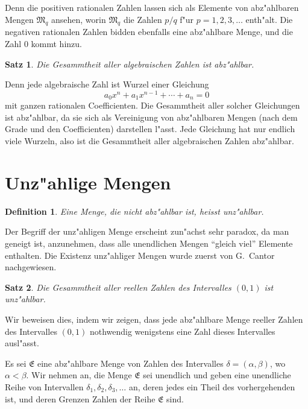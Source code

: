 \documentclass[10pt,a4paper]{article}
\theoremstyle{weberstyle}
\newtheorem{satz}{Satz}[section]
\newtheorem{definition}{Definition}[section]
\begin{document}
Denn die positiven rationalen Zahlen lassen sich als Elemente von
abz"ahlbaren Mengen $\mathfrak{M}_q$ ansehen, worin $\mathfrak{M}_q$ die Zahlen
$p/q$ f"ur $p=1,2,3,\dots$ enth"alt. Die negativen rationalen Zahlen
bidden ebenfalls eine abz"ahlbare Menge, und die Zahl $0$ kommt hinzu.

\begin{satz}
Die Gesammtheit aller algebraischen Zahlen ist abz"ahlbar.
\end{satz}

Denn jede algebraische Zahl ist Wurzel einer Gleichung
\[
a_0x^n+a_1x^{n-1}+\cdots+a_n=0
\]
mit ganzen rationalen Coefficienten. Die Gesammtheit aller solcher
Gleichungen ist abz"ahlbar, da sie sich als Vereinigung von abz"ahlbaren
Mengen (nach dem Grade und den Coefficienten) darstellen l"asst. Jede
Gleichung hat nur endlich viele Wurzeln, also ist die Gesammtheit aller
algebraischen Zahlen abz"ahlbar.

\newpage

%
%
\section{Unz"ahlige Mengen}\label{sec:204}

\begin{definition}
Eine Menge, die nicht abz"ahlbar ist, heisst \emph{unz"ahlbar}.
\end{definition}

Der Begriff der unz"ahligen Menge erscheint zun"achst sehr paradox, da
man geneigt ist, anzunehmen, dass alle unendlichen Mengen ``gleich viel''
Elemente enthalten. Die Existenz unz"ahliger Mengen wurde zuerst von
G.~Cantor nachgewiesen.

\begin{satz}
Die Gesammtheit aller reellen Zahlen des Intervalles $(0,1)$ ist
unz"ahlbar.
\end{satz}

Wir beweisen dies, indem wir zeigen, dass jede abz"ahlbare Menge reeller
Zahlen des Intervalles $(0,1)$ nothwendig wenigstens eine Zahl dieses
Intervalles ausl"asst.

Es sei $\mathfrak{E}$ eine abz"ahlbare Menge von Zahlen des Intervalles
$\delta=(\alpha,\beta)$, wo $\alpha<\beta$. Wir nehmen an, die Menge
$\mathfrak{E}$ sei unendlich und geben eine unendliche Reihe von Intervallen
$\delta_1,\delta_2,\delta_3,\dots$ an, deren jedes ein Theil des vorhergehenden
ist, und deren Grenzen Zahlen der Reihe $\mathfrak{E}$ sind.
\end{document}
